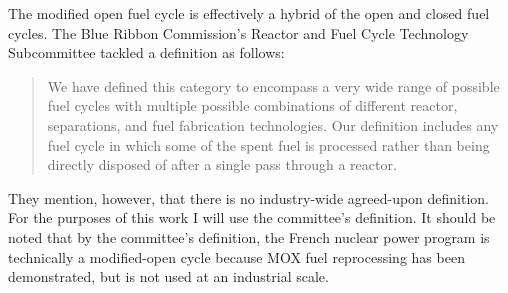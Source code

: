 The modified open fuel cycle is effectively a hybrid of the open and closed fuel
cycles. The Blue Ribbon Commission's Reactor and Fuel Cycle
Technology Subcommittee tackled a definition as follows:

\begin{quotation}
We have defined this category to encompass a very wide range of possible fuel
cycles with multiple possible combinations of different reactor, separations,
and fuel fabrication technologies. Our definition includes any fuel cycle in
which some of the spent fuel is processed rather than being directly disposed of
after a single pass through a reactor.~\cite{brc_reactor_2012}
\end{quotation}

They mention, however, that there is no industry-wide agreed-upon
definition. For the purposes of this work I will use the committee's
definition. It should be noted that by the committee's definition, the French
nuclear power program is technically a modified-open cycle because MOX fuel
reprocessing has been demonstrated, but is not used at an industrial scale.

